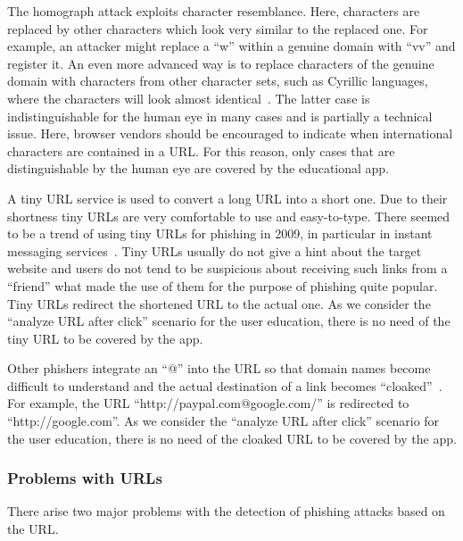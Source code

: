 \begin{description}[leftmargin=0cm]
	\item[Homograph Attacks:] The homograph attack exploits character resemblance.
 Here, characters are replaced by other characters which look very similar to the replaced one.
 For example, an attacker might replace a ``w'' within a genuine domain with ``vv'' and register it.
 An even more advanced way is to replace characters of the genuine domain with characters from other character sets, such as Cyrillic languages, where the characters will look almost identical~\cite{gabrilovich2002homograph}. The latter case is indistinguishable for the human eye in many cases and is partially a technical issue.
Here, browser vendors should be encouraged to indicate when international characters are contained in a URL.
 For this reason, only cases that are distinguishable by the human eye are covered by the educational app.

	\item[Tiny URLs:] A tiny URL service is used to convert a long URL into a short one.
 Due to their shortness tiny URLs are very comfortable to use and easy-to-type.
 There seemed to be a trend of using tiny URLs for phishing in 2009, in particular in instant messaging services~\cite{tinyurlpcworld}.
 Tiny URLs usually do not give a hint about the target website and users do not tend to be suspicious about receiving such links from a ``friend'' what made the use of them for the purpose of phishing quite popular. Tiny URLs redirect the shortened URL to the actual one.
 As we consider the ``analyze URL after click'' scenario for the user education, there is no need of the tiny URL to be covered by the app.

		\item[Cloaked URLs:] Other phishers integrate an ``@'' into the URL so that domain names become difficult to understand and the actual destination of a link becomes ``cloaked''~\cite{alnajim2009fighting}. For example, the URL ``http://paypal.com@google.com/'' is redirected to ``http://google.com''. 
As we consider the ``analyze URL after click'' scenario for the user education, there is no need of the cloaked URL to be covered by the app.

\end{description}

\subsubsection{Problems with URLs}
\label{s:problems_with_URLs}
There arise two major problems with the detection of phishing attacks based on the URL.


